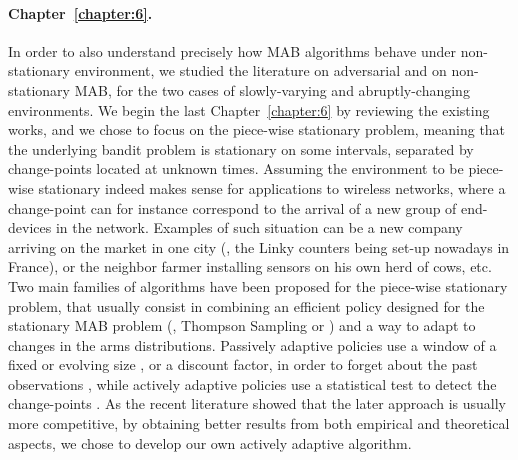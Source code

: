 \paragraph{Chapter~\ref{chapter:6}.}
%
In order to also understand precisely how MAB algorithms behave under non-stationary environment, we studied the literature on adversarial and on non-stationary MAB, for the two cases of slowly-varying and abruptly-changing environments.
We begin the last Chapter~\ref{chapter:6} by reviewing the existing works,
and we chose to focus on the piece-wise stationary problem,
meaning that the underlying bandit problem is stationary on some intervals, separated by change-points located at unknown times.
Assuming the environment to be piece-wise stationary indeed makes sense for applications to wireless networks, where a change-point can for instance correspond to the arrival of a new group of end-devices in the network. Examples of such situation can be a new company arriving on the market in one city (\eg, the Linky counters being set-up nowadays in France), or the neighbor farmer installing sensors on his own herd of cows, etc.
%
Two main families of algorithms have been proposed for the piece-wise stationary problem,
that usually consist in combining an efficient policy designed for the stationary MAB problem (\eg, Thompson Sampling or \klUCB) and a way to adapt to changes in the arms distributions.
Passively adaptive policies use a window of a fixed or evolving size \cite{Garivier11UCBDiscount}, or a discount factor, in order to forget about the past observations \cite{Kocsis06,Gupta11thompson},
while actively adaptive policies use a statistical test to detect the change-points \cite{MellorShapiro13,Allesiardo15}.
%
As the recent literature showed that the later approach is usually more competitive, by obtaining better results from both empirical and theoretical aspects, we chose to develop our own actively adaptive algorithm.

